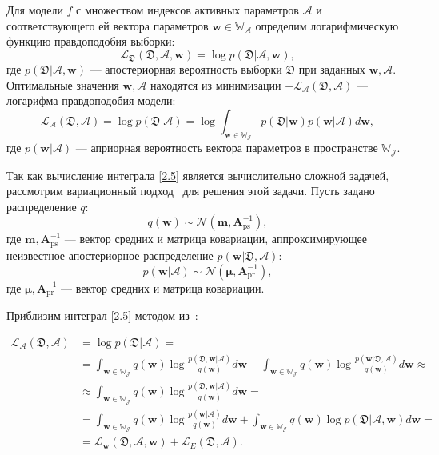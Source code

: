 Для модели $f$ с множеством индексов активных параметров $\mathcal{A}$ и соответствующего ей вектора параметров $\textbf{w} \in \mathbb{W_\mathcal{A}}$  определим логарифмическую функцию правдоподобия выборки:
\[
\label{2.4}
\mathcal{L}_\mathfrak{D}(\mathfrak{D}, \mathcal{A}, \textbf{w}) = \log p(\mathfrak{D}|\mathcal{A}, \textbf{w}),
\]
где $p(\mathfrak{D}|\mathcal{A},\textbf{w})$ --- апостериорная вероятность выборки $\mathfrak{D}$ при заданных $\textbf{w}, \mathcal{A}$.
Оптимальные значения $\textbf{w},\mathcal{A}$ находятся из минимизации $-\mathcal{L}_{\mathcal{A}}(\mathfrak{D},\mathcal{A})$ --- логарифма правдоподобия модели:
\[
\label{2.5}
\mathcal{L}_{\mathcal{A}}(\mathfrak{D},\mathcal{A}) =\log p(\mathfrak{D}|\mathcal{A}) = \log  \int_{{\textbf{w}\in\mathbb{W_\mathcal{J}}}}
p(\mathfrak{D} | \textbf{w}) p(\textbf{w} | \mathcal{A}) d \textbf{w},
\]
где $p(\textbf{w}|\mathcal{A})$ ---  априорная вероятность вектора параметров в пространстве $\mathbb{W_\mathcal{J}}$.

Так как вычисление интеграла \eqref{2.5} является вычислительно сложной задачей, рассмотрим вариационный подход~\cite{bishop2006} для решения этой задачи. Пусть задано распределение $q$:
\[
\label{2.6}
q(\textbf{w})\sim \mathcal{N}(\textbf{m}, \textbf{A}^{-1}_\text{ps}),
\]
где $\textbf{m}, \textbf{A}^{-1}_\text{ps}$ --- вектор средних и матрица ковариации, аппроксимирующее неизвестное апостериорное распределение $p(\textbf{w}|\mathfrak{D},\mathcal{A})$:
\[
\label{2.7}
p(\textbf{w} | \mathcal{A})\sim \mathcal{N}(\boldsymbol{\mu},\textbf{A}^{-1}_{\text{pr}}),
\]
где $\boldsymbol{\mu},\textbf{A}^{-1}_{\text{pr}}$ --- вектор средних и матрица ковариации.

Приблизим интеграл \eqref{2.5} методом из~\cite{bishop2006}:

\[
\label{2.8}
\begin{aligned}
\mathcal{L}_{\mathcal{A}}(\mathfrak{D},\mathcal{A}) &= \log p(\mathfrak{D}|\mathcal{A}) = \\
&=\int_{\textbf{w}\in\mathbb{W_\mathcal{J}}} q(\textbf{w}) \log \frac{p(\mathfrak{D}, \textbf{w}|\mathcal{A})}{q(\textbf{w})}d \textbf{w} - \int_{\textbf{w}\in\mathbb{W_\mathcal{J}}}  q(\textbf{w}) \log \frac{p(\textbf{w}|\mathfrak{D},\mathcal{A})}{q(\textbf{w})}d \textbf{w} \approx \\
&\approx \int_{\textbf{w}\in\mathbb{W_\mathcal{J}}} q(\textbf{w}) \log \frac{p(\mathfrak{D}, \textbf{w}|\mathcal{A})}{q(\textbf{w})}d \textbf{w} = \\
&= \int_{\textbf{w}\in\mathbb{W_\mathcal{J}}} q(\textbf{w}) \log \frac{p(\textbf{w}| \mathcal{A})}{q(\textbf{w})}d \textbf{w} + \int_{\textbf{w}\in\mathbb{W_\mathcal{J}}} q(\textbf{w}) \log p(\mathfrak{D}|\mathcal{A}, \textbf{w})d \textbf{w}=\\
&=\mathcal{L}_\textbf{w}(\mathfrak{D}, \mathcal{A}, \textbf{w})+\mathcal{L}_{E}(\mathfrak{D},\mathcal{A}).
\end{aligned}
\]

